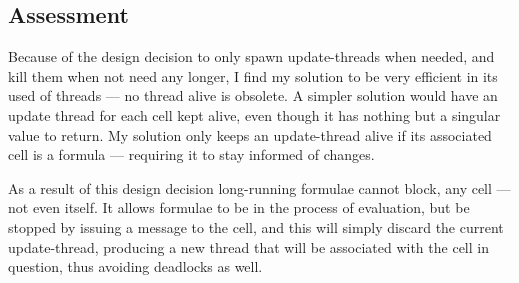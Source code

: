 %
%

\subsection{Assessment}
Because of the design decision to only spawn update-threads when needed, and
kill them when not need any longer, I find my solution to be very efficient in
its used of threads --- no thread alive is obsolete. A simpler solution would
have an update thread for each cell kept alive, even though it has nothing but
a singular value to return. My solution only keeps an update-thread alive if
its associated cell is a formula --- requiring it to stay informed of changes.

As a result of this design decision long-running formulae cannot block, any
cell --- not even itself. It allows formulae to be in the process of
evaluation, but be stopped by issuing a  message to the cell,
and this will simply discard the current update-thread, producing a new thread
that will be associated with the cell in question, thus avoiding deadlocks as
well.
